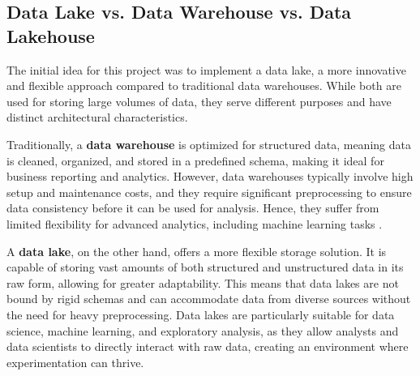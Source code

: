 \subsection{Data Lake vs. Data Warehouse vs. Data Lakehouse}
The initial idea for this project was to implement a data lake, a more innovative and flexible approach compared to traditional data warehouses. While both are used for storing large volumes of data, they serve different purposes and have distinct architectural characteristics.

Traditionally, a \textbf{data warehouse} is optimized for structured data, meaning data is cleaned, organized, and stored in a predefined schema, making it ideal for business reporting and analytics. However, data warehouses typically involve high setup and maintenance costs, and they require significant preprocessing to ensure data consistency before it can be used for analysis. Hence, they suffer from limited flexibility for advanced analytics, including machine learning tasks \cite{bdcc6040132}.

A \textbf{data lake}, on the other hand, offers a more flexible storage solution. It is capable of storing vast amounts of both structured and unstructured data in its raw form, allowing for greater adaptability. This means that data lakes are not bound by rigid schemas and can accommodate data from diverse sources without the need for heavy preprocessing. Data lakes are particularly suitable for data science, machine learning, and exploratory analysis, as they allow analysts and data scientists to directly interact with raw data, creating an environment where experimentation can thrive. 

